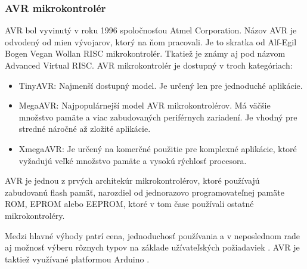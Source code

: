 \subsubsection{AVR mikrokontrolér}
\noindent
AVR bol vyvinutý v roku 1996 spoločnosťou Atmel Corporation. Názov AVR je odvodený od mien vývojarov, ktorý na ňom pracovali. Je to skratka od  Alf-Egil Bogen Vegan Wollan RISC mikrokontrolér. Tkatiež je známy aj pod názvom Advanced Virtual RISC. AVR mikrokontrolér je dostupný v troch kategóriach:
\begin{itemize}
    \item TinyAVR: Najmenší dostupný model. Je určený len pre jednoduché aplikácie.
    \item MegaAVR: Najpopulárnejší model AVR mikrokontrolérov. Má väčšie množstvo pamäte a viac zabudovaných periférnych zariadení. Je vhodný pre stredné náročné až zložité aplikácie.
    \item XmegaAVR: Je určený na komerčné použitie pre komplexné aplikácie, ktoré vyžadujú veľké množstvo pamäte a vysokú rýchlosť procesora.
\end{itemize}

AVR je jednou z prvých architekúr mikrokontrolérov, ktoré používajú zabudovanú flash pamäť, narozdiel od jednorazovo programovateľnej pamäte ROM, EPROM alebo EEPROM, ktoré v tom čase používali ostatné mikrokontroléry.
\par
Medzi hlavné výhody patrí cena, jednoduchosť používania a v neposlednom rade aj možnosť výberu rôznych typov na základe užívateľských požiadaviek \cite{shidlingDifferentTypesMicrocontrollers2020}. AVR je taktiež využívané platformou Arduino \cite{AVRVsArduinoWhich2017}.




